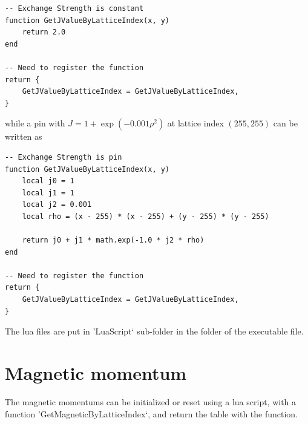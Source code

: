 \documentclass[aps,superscriptaddress,groupedaddress]{revtex4}  %
\begin{document}
\begin{lstlisting}
-- Exchange Strength is constant
function GetJValueByLatticeIndex(x, y)
    return 2.0
end

-- Need to register the function
return {
    GetJValueByLatticeIndex = GetJValueByLatticeIndex,
}
\end{lstlisting}
while a pin with $J=1+\exp \left(-0.001 \rho ^2\right)$ at lattice index $(255, 255)$ can be written as
\begin{lstlisting}
-- Exchange Strength is pin
function GetJValueByLatticeIndex(x, y)
    local j0 = 1
    local j1 = 1
    local j2 = 0.001
    local rho = (x - 255) * (x - 255) + (y - 255) * (y - 255)

    return j0 + j1 * math.exp(-1.0 * j2 * rho)
end

-- Need to register the function
return {
    GetJValueByLatticeIndex = GetJValueByLatticeIndex,
}
\end{lstlisting}

The lua files are put in 'LuaScript` sub-folder in the folder of the executable file.

\section{\label{sec:3}Magnetic momentum}

The magnetic momentums can be initialized or reset using a lua script, with a function 'GetMagneticByLatticeIndex`, and return the table with the function.
\end{document}
